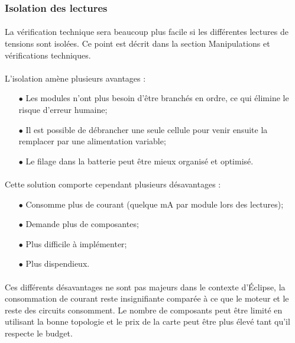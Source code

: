 	
	\subsubsection*{Isolation des lectures}
	\paragraph*{}
	La vérification technique sera beaucoup plus facile si les différentes lectures de tensions sont isolées. Ce point est décrit dans la section Manipulations et vérifications techniques. 
	
	\paragraph*{}
	L'isolation amène plusieurs avantages :
	
	\begin{itemize}
		\item[$\bullet$] Les modules n'ont plus besoin d'être branchés en ordre, ce qui élimine le risque d'erreur humaine;
		\item[$\bullet$] Il est possible de débrancher une seule cellule pour venir ensuite la remplacer par une alimentation variable;
		\item[$\bullet$] Le filage dans la batterie peut être mieux organisé et optimisé.
	\end{itemize}

	\paragraph*{}
	Cette solution comporte cependant plusieurs désavantages :
	
	\begin{itemize}
		\item[$\bullet$] Consomme plus de courant (quelque mA par module lors des lectures);
		\item[$\bullet$] Demande plus de composantes;
		\item[$\bullet$] Plus difficile à implémenter;
		\item[$\bullet$] Plus dispendieux.
	\end{itemize}
	
	\paragraph*{}
	Ces différents désavantages ne sont pas majeurs dans le contexte d'Éclipse, la consommation de courant reste insignifiante comparée à ce que le moteur et le reste des circuits consomment. Le nombre de composants peut être limité en utilisant la bonne topologie et le prix de la carte peut être plus élevé tant qu'il respecte le budget. 
	

